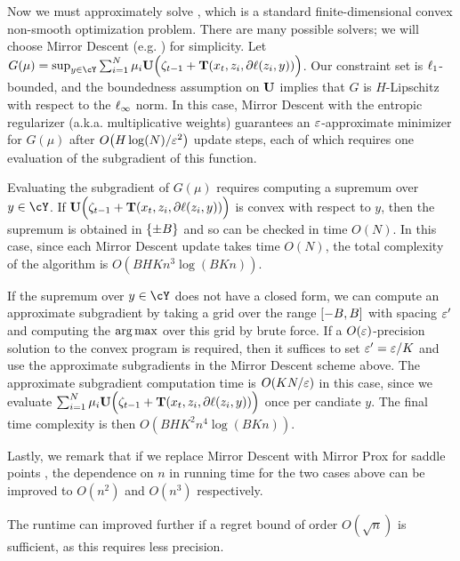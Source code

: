 Now we must approximately solve , which is a standard finite-dimensional convex non-smooth optimization problem. There are many possible solvers; we will choose Mirror Descent (e.g. \citep{nemirovskii1983problem,nesterov1998introductory,ben2001lectures}) for simplicity. Let $G(\mu)=\sup_{y\in\cY}\sum_{i=1}^{N}\mu_{i}\burk\Big(\zeta_{t-1} + \suff(x_t,z_{i},\partial \loss(z_{i},y))\Big)$. Our constraint set is $\ls_1$-bounded, and the boundedness assumption on $\burk$ implies that $G$ is $H$-Lipschitz with respect to the $\ls_{\infty}$ norm. In this case, Mirror Descent with the entropic regularizer (a.k.a. multiplicative weights) guarantees an $\veps$-approximate minimizer for $G(\mu)$ after $O\prn*{H\log(N)/\veps^{2}}$ update steps, each of which requires one evaluation of the subgradient of this function.

Evaluating the subgradient of $G(\mu)$ requires computing a supremum over $y\in\cY$. If $\burk\Big(\zeta_{t-1} + \suff(x_t,z_{i},\partial \loss(z_{i},y))\Big)$ is convex with respect to $y$, then the supremum is obtained in $\crl*{\pm{}B}$ and so can be checked in time $O(N)$. In this case, since each Mirror Descent update takes time $O(N)$, the total complexity of the algorithm is $O(BHKn^{3}\log(BKn))$.

If the supremum over $y\in\cY$ does not have a closed form, we can compute an approximate subgradient by taking a grid over the range $\brk*{-B,B}$ with spacing $\veps'$ and computing the $\argmax$ over this grid by brute force. If a $O(\veps)$-precision solution to the convex program is required, then it suffices to set $\veps'=\veps/K$ and use the approximate subgradients in the Mirror Descent scheme above. The approximate subgradient computation time is $O(KN/\veps)$ in this case, since we evaluate $\sum_{i=1}^{N}\mu_{i}\burk\Big(\zeta_{t-1} + \suff(x_t,z_{i},\partial \loss(z_{i},y))\Big)$ once per candiate $y$. The final time complexity is then $O(BHK^2n^{4}\log(BKn))$.

Lastly, we remark that if we replace Mirror Descent with Mirror Prox for saddle points \citep{nemirovski2004prox}, the dependence on $n$ in running time for the two cases above can be improved to $O(n^{2})$ and $O(n^{3})$ respectively.

The runtime can improved further if a regret bound of order $O(\sqrt{n})$ is sufficient, as this requires less precision.

